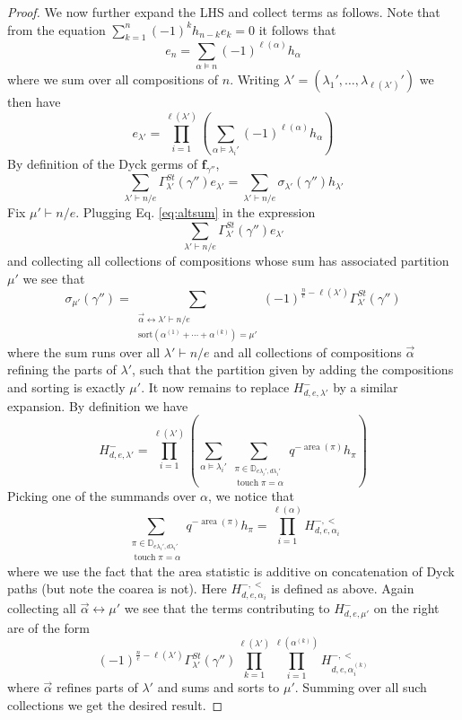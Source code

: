 \documentclass{amsart}
\numberwithin{equation}{section}
\theoremstyle{definition}
\DeclareMathOperator{\touch}{touch}
\newcommand{\Dyck}{\mathbb{D}}
\DeclareMathOperator{\area}{\mathrm{area}}
\begin{document}
\begin{proof}
We now further expand the LHS and collect terms as follows. Note that from the equation $\sum_{k=1}^n(-1)^k h_{n-k}e_k=0$ it follows that 
$$e_n=\sum_{\alpha \vDash n}(-1)^{\ell(\alpha)} h_\alpha$$ where we sum over all compositions of $n$.
Writing $\lambda'=(\lambda_1',\ldots,\lambda_{\ell(\lambda')}')$ we then have 
\begin{equation}
\label{eq:altsum}
e_{\lambda'}=\prod_{i=1}^{\ell(\lambda')}(\sum_{\alpha \vDash \lambda_i'} (-1)^{\ell(\alpha)}h_\alpha)
\end{equation}
By definition of the Dyck germs of $\mathbf{f}_{\gamma''}$, $$\sum_{\lambda'\vdash n/e} \Gamma^{St}_{\lambda'}(\gamma'')e_{\lambda'}=\sum_{\lambda'\vdash n/e} \sigma_{\lambda'}(\gamma'')h_{\lambda'}$$
Fix $\mu'\vdash n/e$. Plugging Eq. \eqref{eq:altsum} in the expression
$$\sum_{\lambda'\vdash n/e} \Gamma^{St}_{\lambda'}(\gamma'')e_{\lambda'}$$
and collecting all collections of compositions whose sum has associated partition $\mu'$ we see that
$$\sigma_{\mu'}(\gamma'')=\sum_{\substack{\vec{\alpha}\leftrightarrow \lambda'\vdash n/e\\\text{sort}(\alpha^{(1)}+\cdots+\alpha^{(k)})=\mu'}}
(-1)^{\frac{n}{e}-\ell(\lambda')}\Gamma^{St}_{\lambda'}(\gamma'')$$ where the sum runs over all $\lambda'\vdash n/e$ and all collections of compositions $\vec{\alpha}$ refining the parts of $\lambda'$, such that the partition given by adding the compositions and sorting is exactly $\mu'$.
It now remains to replace $H^-_{d,e,\lambda'}$ by a similar expansion.
By definition we have 
$$
H^-_{d,e,\lambda'}=\prod_{i=1}^{\ell(\lambda')}
(\sum_{\alpha\vDash \lambda_i'}\sum_{\substack{\pi \in \Dyck_{e\lambda_i',d\lambda_i'}\\ \touch{\pi}=\alpha}} q^{-\area(\pi)}h_\pi)
$$
Picking one of the summands over $\alpha$, we notice that  $$\sum_{\substack{\pi \in \Dyck_{e\lambda_i',d\lambda_i'}\\ \touch{\pi}=\alpha}} q^{-\area(\pi)}h_\pi=
\prod_{i=1}^{\ell(\alpha)}H^{-,<}_{d,e,\alpha_i}$$ 
where we use the fact that the area statistic is additive on concatenation of Dyck paths (but note the coarea is not). Here $H^{-,<}_{d,e,\alpha_i}$ is defined as above.
Again collecting all $\vec{\alpha}\leftrightarrow \mu'$ we see that 
the terms contributing to $H_{d,e,\mu'}^{-}$ on the right are of the form
$$(-1)^{\frac{n}{e}-\ell(\lambda')}\Gamma^{St}_{\lambda'}(\gamma'') \prod_{k=1}^{\ell(\lambda')}\prod_{i=1}^{\ell(\alpha^{(k)})}H^{-,<}_{d,e,\alpha^{(k)}_i}$$
where $\vec{\alpha}$ refines parts of $\lambda'$ and sums and sorts to $\mu'$. Summing over all such collections
we get the desired result.
\end{proof}
\end{document}

